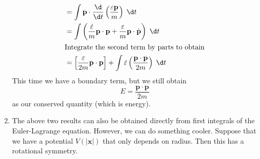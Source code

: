 \documentclass[a4paper]{article}
\begin{document}
\begin{eg}
\begin{enumerate}
\begin{align*}
        &= \int \mathbf{p}\cdot \frac{\d}{\d t}\left(\frac{\varepsilon \mathbf{p}}{m}\right)\;\d t\\
        &= \int \left(\frac{\dot{\varepsilon}}{m}\mathbf{p}\cdot \mathbf{p} + \frac{\varepsilon}{m}\mathbf{p}\cdot \dot{\mathbf{p}}\right)\;\d t\\
        \intertext{Integrate the second term by parts to obtain}
        &= \left[\frac{\varepsilon}{2m}\mathbf{p}\cdot \mathbf{p}\right] + \int \dot{\varepsilon} \left(\frac{\mathbf{p}\cdot \mathbf{p}}{2m}\right)\;\d t
      \end{align*}
      This time we have a boundary term, but we still obtain
      \[
        E = \frac{\mathbf{p}\cdot \mathbf{p}}{2m}
      \]
      as our conserved quantity (which is energy).

    \item The above two results can also be obtained directly from first integrals of the Euler-Lagrange equation. However, we can do something cooler. Suppose that we have a potential $V(|\mathbf{x}|)$ that only depends on radius. Then this has a rotational symmetry.


\end{enumerate}
\end{eg}
\end{document}
